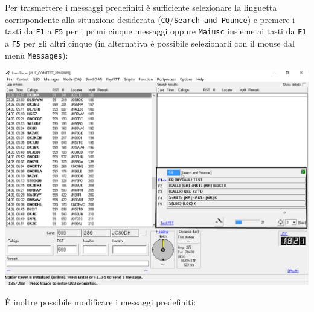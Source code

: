 \begin{samepage}
	Per trasmettere i messaggi predefiniti \`e sufficiente selezionare la linguetta corrispondente alla situazione desiderata (\texttt{CQ}/\texttt{Search and Pounce}) e premere i tasti da \texttt{F1} a \texttt{F5} per i primi cinque messaggi oppure \texttt{Maiusc} insieme ai tasti da \texttt{F1} a \texttt{F5} per gli altri cinque (in alternativa \`e possibile selezionarli con il mouse dal men\`u \texttt{Messages}):
\begin{center}
	\includegraphics[width=\linewidth]{./use03.png}
\end{center}
\end{samepage}
\pagebreak
\`E inoltre possibile modificare i messaggi predefiniti:
